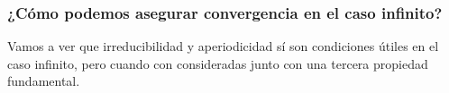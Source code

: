 %
%
%
%
%
%


\begin{frame}
\frametitle{¿Cómo podemos asegurar convergencia en el caso infinito?}

{\small

Vamos a ver que irreducibilidad y  aperiodicidad sí son condiciones útiles en el caso infinito, pero cuando con consideradas junto con una tercera propiedad fundamental.

}

\end{frame}


